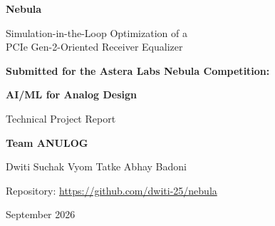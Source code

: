 \documentclass[11pt,a4paper]{report}
\newcommand{\projecturl}{https://github.com/dwiti-25/nebula}
\begin{document}
\begin{titlepage}
  \centering
  \vspace*{28mm}
  {\Huge\bfseries Nebula\par}
  \vspace{5mm}
  {\LARGE Simulation-in-the-Loop Optimization of a\\[2mm]
  PCIe Gen-2-Oriented Receiver Equalizer\par}
  \vspace{14mm}
  {\Large\bfseries Submitted for the Astera Labs Nebula Competition:\par}
  \vspace{2mm}
  {\large\bfseries AI/ML for Analog Design\par}
  \vspace{10mm}
  {\large Technical Project Report\par}
  \vfill
  {\large\bfseries Team ANULOG\par}
  \vspace{3mm}
  {\large Dwiti Suchak \quad Vyom Tatke \quad Abhay Badoni\par}
  \vspace{14mm}
  {\normalsize Repository: \href{\projecturl}{\projecturl}\par}
  \vspace{4mm}
  {\normalsize September 2026\par}
  \vspace*{18mm}
\end{titlepage}


\tableofcontents
\listoffigures
\listoftables
\clearpage
{}














\appendix






\end{document}

